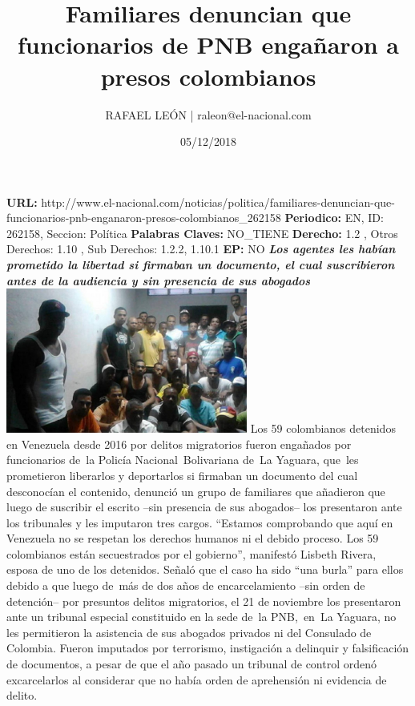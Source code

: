 \documentclass{article}%
\title{\textbf{Familiares denuncian que funcionarios de PNB engañaron a presos colombianos}}%
\author{RAFAEL LEÓN | raleon@el{-}nacional.com}%
\date{05/12/2018}%
\begin{document}
%
\normalsize%
\maketitle%
\textbf{URL: }%
http://www.el{-}nacional.com/noticias/politica/familiares{-}denuncian{-}que{-}funcionarios{-}pnb{-}enganaron{-}presos{-}colombianos\_262158\newline%
%
\textbf{Periodico: }%
EN, %
ID: %
262158, %
Seccion: %
Política\newline%
%
\textbf{Palabras Claves: }%
NO\_TIENE\newline%
%
\textbf{Derecho: }%
1.2%
, Otros Derechos: %
1.10%
, Sub Derechos: %
1.2.2, 1.10.1%
\newline%
%
\textbf{EP: }%
NO\newline%
\newline%
%
\textbf{\textit{Los agentes les habían prometido la libertad si firmaban un documento, el cual suscribieron antes de la audiencia y sin presencia de sus abogados}}%
\newline%
\newline%
%
\includegraphics[width=300px]{217.jpg}%
\newline%
%
Los 59 colombianos detenidos en Venezuela desde 2016 por delitos migratorios fueron engañados por funcionarios de~la Policía Nacional~Bolivariana de~La Yaguara, que~les prometieron liberarlos y deportarlos si firmaban un documento del cual desconocían el contenido, denunció un grupo de familiares que añadieron que luego de suscribir el escrito –sin presencia de sus abogados– los presentaron ante los tribunales y les imputaron tres cargos.%
\newline%
%
“Estamos comprobando que aquí en Venezuela no se respetan los derechos humanos ni el debido proceso. Los 59 colombianos están secuestrados por el gobierno”, manifestó Lisbeth Rivera, esposa de uno de los detenidos.%
\newline%
%
Señaló que el caso ha sido “una burla” para ellos debido a que luego de~más de dos años de encarcelamiento –sin orden de detención– por presuntos delitos migratorios, el 21 de noviembre los presentaron ante un tribunal especial constituido en la sede de~la PNB,~en~La Yaguara, no les permitieron la asistencia de sus abogados privados ni del Consulado de Colombia. Fueron imputados por terrorismo, instigación a delinquir y falsificación de documentos, a pesar de que el año pasado un tribunal de control ordenó excarcelarlos al considerar que no había orden de aprehensión ni evidencia de delito.%
\end{document}
